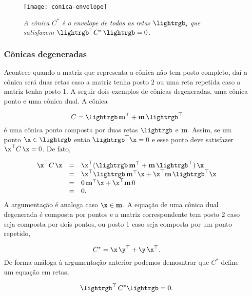 \begin{figure}[!htb]
\centering
\texttt{[image: conica-envelope]}
\caption{\textit{A cônica $C^*$ é o envelope de todas as retas $\lightrgb_i$ que satisfazem $\lightrgb^\top C^*\,\lightrgb=0$.}}
\label{fig.conica-envelope}
\end{figure}

\subsubsection{Cônicas degeneradas}\label{sec.conicas-degeneradas}

Acontece quando a matriz que representa a cônica não tem posto completo, daí a cônica será duas retas caso a matriz tenha posto $2$ ou uma reta repetida caso a matriz tenha posto $1$. A seguir dois exemplos de cônicas degeneradas, uma cônica ponto e uma cônica dual. A cônica 

\begin{equation*}
C=\lightrgb\,{\bf m}^\top+{\bf m}\,\lightrgb^\top
\end{equation*}
é uma cônica ponto composta por duas retas $\lightrgb$ e ${\bf m}$. Assim, se um ponto $\x\in\lightrgb$ então $\lightrgb^\top\x=0$ e esse ponto deve satisfazer $\x^\top C\,\x=0$. De fato,

\begin{equation*}
\begin{array}{rcl}
\x^\top C\,\x&=&\x^\top(\lightrgb\,{\bf m}^\top+{\bf m}\,\lightrgb^\top)\,\x\\
&=&\x^\top\lightrgb\,{\bf m}^\top\x+\x^\top {\bf m}\,\lightrgb^\top\x\\
&=&0\,{\bf m}^\top\x+\x^\top{\bf m}\,0\\
&=&0.
\end{array}
\end{equation*}
A argumentação é analoga caso $\x\in{\bf m}$. A equação de uma cônica dual degenerada é composta por pontos e a matriz correspondente tem posto 2 caso seja composta por dois pontos, ou posto 1 caso seja composta por um ponto repetido, 

\begin{equation*}
C^*=\x\,\y^\top+\y\,\x^\top.
\end{equation*}
De forma análoga à argumentação anterior podemos demosntrar que $C^*$ define um equação em retas,

\begin{equation*}
\lightrgb^\top\,C^*\lightrgb=0.
\end{equation*}

